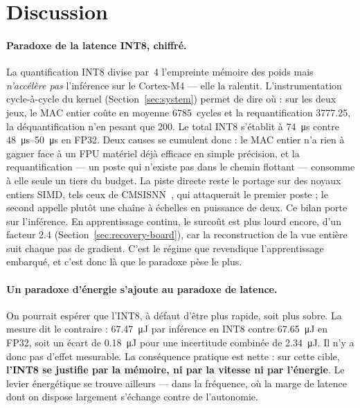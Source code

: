 \section{Discussion}
\label{sec:discussion}

\paragraph{Paradoxe de la latence INT8, chiffré.} La quantification INT8 divise par~4 l'empreinte mémoire
des poids mais \emph{n'accélère pas} l'inférence sur le Cortex-M4 --- elle la ralentit. L'instrumentation
cycle-à-cycle du kernel (Section~\ref{sec:system}) permet de dire où : sur les deux jeux, le MAC entier
coûte en moyenne \num{6785}~cycles et la requantification \num{3777.25}, la déquantification n'en pesant que
\num{200}. Le total INT8 s'établit à \SI{74}{\micro\second} contre \SIrange{48}{50}{\micro\second} en FP32.
Deux causes se cumulent donc : le MAC entier n'a rien à gagner face à un FPU matériel déjà efficace en
simple précision, et la requantification --- un poste qui n'existe pas dans le chemin flottant --- consomme à
elle seule un tiers du budget. La piste directe reste le portage sur des noyaux entiers \gls{SIMD}, tels ceux de
\gls{CMSISNN}~\cite{Lai2018CMSISNN}, qui
attaquerait le premier poste ; le second appelle plutôt une chaîne à échelles en puissance de deux.
Ce bilan porte sur l'inférence. En apprentissage continu, le surcoût est plus lourd encore, d'un facteur
\num{2.4} (Section~\ref{sec:recovery-board}), car la reconstruction de la vue entière suit chaque pas de
gradient. C'est le régime que revendique l'apprentissage embarqué, et c'est donc là que le paradoxe pèse
le plus.

\paragraph{Un paradoxe d'énergie s'ajoute au paradoxe de latence.} On pourrait espérer que l'INT8, à défaut
d'être plus rapide, soit plus sobre. La mesure dit le contraire : \SI{67.47}{\micro\joule} par inférence en
INT8 contre \SI{67.65}{\micro\joule} en FP32, soit un écart de \SI{0.18}{\micro\joule} pour une incertitude
combinée de \SI{2.34}{\micro\joule}. Il n'y a donc pas d'effet mesurable. La conséquence pratique est nette :
sur cette cible, \textbf{l'INT8 se justifie par la mémoire, ni par la vitesse ni par l'énergie}. Le levier
énergétique se trouve ailleurs --- dans la fréquence, où la marge de latence dont on dispose largement
s'échange contre de l'autonomie.

